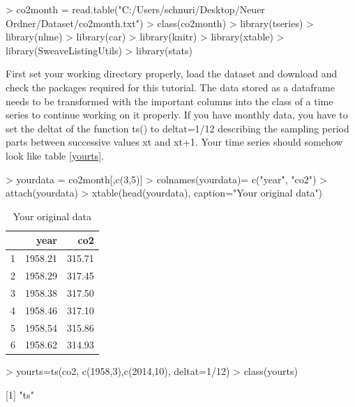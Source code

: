 \documentclass[11pt, a4paper]{article} %
\begin{document}
\begin{Schunk}
\begin{Sinput}
> co2month = read.table("C:/Users/schnuri/Desktop/Neuer Ordner/Dataset/co2month.txt")
> class(co2month)
> library(tseries)
> library(nlme)
> library(car)
> library(knitr)
> library(xtable)
> library(SweaveListingUtils)
> library(stats)
\end{Sinput}
\end{Schunk}
First set your working directory properly, load the dataset and download and check the packages required for this tutorial. The data stored as a dataframe needs to be transformed with the important columns into the class of a time series to continue working on it properly. If you have monthly data, you have to set the deltat of the function ts() to deltat=1/12 describing the sampling period parts between successive values xt and xt+1. Your time series should somehow look like table \ref{yourts}.\\

\begin{Schunk}
\begin{Sinput}
> yourdata = co2month[,c(3,5)]
> colnames(yourdata)= c("year", "co2")
> attach(yourdata)
> xtable(head(yourdata), caption="Your original data")
\end{Sinput}
\begin{table}[ht]
\centering
\begin{tabular}{rrr}
  \hline
 & year & co2 \\ 
  \hline
1 & 1958.21 & 315.71 \\ 
  2 & 1958.29 & 317.45 \\ 
  3 & 1958.38 & 317.50 \\ 
  4 & 1958.46 & 317.10 \\ 
  5 & 1958.54 & 315.86 \\ 
  6 & 1958.62 & 314.93 \\ 
   \hline
\end{tabular}
\caption{Your original data} 
\end{table}\begin{Sinput}
> yourts=ts(co2, c(1958,3),c(2014,10), deltat=1/12)
> class(yourts)
\end{Sinput}
[1] "ts"\end{Schunk}
\end{document}
